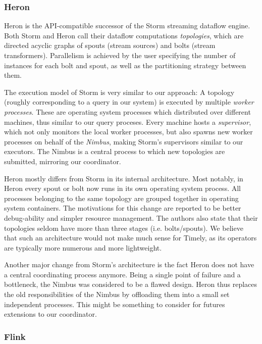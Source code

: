 
\subsubsection{Heron}

Heron \cite{heron} is the API-compatible successor of the Storm \cite{storm}
streaming dataflow engine.
Both Storm and Heron call their dataflow computations \emph{topologies}, which 
are directed acyclic graphs of spouts (stream sources) and bolts
(stream transformers). Parallelism is achieved by the user specifying the
number of instances for each bolt and spout, as well as the partitioning
strategy between them.

The execution model of Storm is very similar to our approach: A topology
(roughly corresponding to a query in our system) is executed by multiple
\emph{worker processes}. These are operating system processes which distributed
over different machines, thus similar to our query proceses. Every machine hosts
a \emph{supervisor}, which not only monitors the local worker processes, but also spawns new worker
processes on behalf of the \emph{Nimbus}, making Storm's supervisors similar to our executors.
The Nimbus is a central process to which new topologies are submitted, mirroring our coordinator.

Heron mostly differs from Storm in its internal architecture. Most notably, in
Heron every spout or bolt now runs in its own operating system process. All processes
belonging to the same topology are grouped together in operating system containers.
The motivations for this change are reported to be better debug-ability
and simpler resource management. The authors also state that their topologies
seldom have more than three stages (i.e. bolts/spouts). We believe that such
an architecture would not make much sense for Timely, as its operators are typically
more numerous and more lightweight.

Another major change from Storm's architecture
is the fact Heron does not have a central coordinating process anymore. Being
a single point of failure and a bottleneck, the Nimbus was considered to be a
flawed design. Heron thus replaces the old responsibilities of the Nimbus by
offloading them into a small set independent processes. This might be something
to consider for futures extensions to our coordinator.

\subsubsection{Flink}

